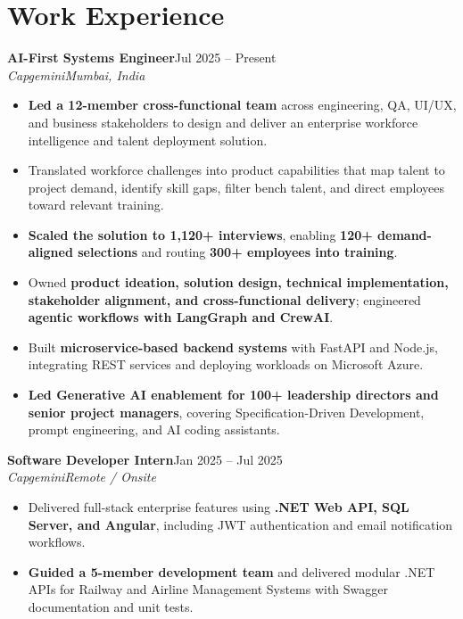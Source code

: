 \documentclass[10pt,a4paper]{article}
\newcommand{\resumeentry}[4]{%
  \noindent\textbf{#1}\hfill #2\\[-1pt]
  \noindent\textit{#3}\hfill\textit{#4}\\[-1pt]
}
\begin{document}
\section*{Work Experience}
\resumeentry{AI-First Systems Engineer}{Jul 2025 -- Present}{Capgemini}{Mumbai, India}
\begin{itemize}\small
\item \textbf{Led a 12-member cross-functional team} across engineering, QA, UI/UX, and business stakeholders to design and deliver an enterprise workforce intelligence and talent deployment solution.
\item Translated workforce challenges into product capabilities that map talent to project demand, identify skill gaps, filter bench talent, and direct employees toward relevant training.
\item \textbf{Scaled the solution to 1,120+ interviews}, enabling \textbf{120+ demand-aligned selections} and routing \textbf{300+ employees into training}.
\item Owned \textbf{product ideation, solution design, technical implementation, stakeholder alignment, and cross-functional delivery}; engineered \textbf{agentic workflows with LangGraph and CrewAI}.
\item Built \textbf{microservice-based backend systems} with FastAPI and Node.js, integrating REST services and deploying workloads on Microsoft Azure.
\item \textbf{Led Generative AI enablement for 100+ leadership directors and senior project managers}, covering Specification-Driven Development, prompt engineering, and AI coding assistants.
\end{itemize}
\resumeentry{Software Developer Intern}{Jan 2025 -- Jul 2025}{Capgemini}{Remote / Onsite}
\begin{itemize}\small
\item Delivered full-stack enterprise features using \textbf{.NET Web API, SQL Server, and Angular}, including JWT authentication and email notification workflows.
\item \textbf{Guided a 5-member development team} and delivered modular .NET APIs for Railway and Airline Management Systems with Swagger documentation and unit tests.
\end{itemize}
\end{document}
